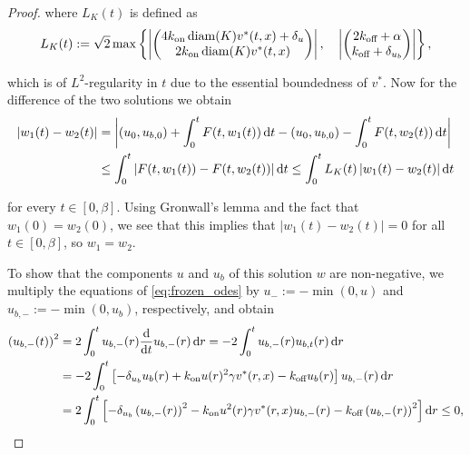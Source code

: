 \begin{proof}
    \noindent
    where $L_K(t)$ is defined as
%
    \begin{equation*}
        L_K(t) := \sqrt{2} \max \left\{ \left| \begin{pmatrix}
            4 k_\text{on} \operatorname*{diam}(K) v^*(t, x) + \delta_u \\
            2 k_\text{on} \operatorname*{diam}(K) v^*(t, x)
        \end{pmatrix} \right| ,\quad \left| \begin{pmatrix}
            2 k_\text{off} + \alpha \\
            k_\text{off} + \delta_{u_b}
        \end{pmatrix} \right| \right\} ,
    \end{equation*}

    \noindent
    which is of $L^2$-regularity in $t$ due to the essential boundedness of $v^*$. Now for the difference of the two solutions we obtain
%
    \begin{equation*}
        \begin{aligned}
            \left|w_1(t) - w_2(t)\right| &= \left|(u_0, u_{b,0}) + \int_{0}^{t} F(t, w_1(t)) \mathop{}\!\mathrm{d} t - (u_0, u_{b,0}) - \int_{0}^{t} F(t, w_2(t)) \mathop{}\!\mathrm{d} t \right| \\
            &\leq \int_{0}^{t} \left|F(t, w_1(t)) - F(t, w_2(t))\right| \mathop{}\!\mathrm{d} t \leq \int_{0}^{t} L_K(t) \left|w_1(t) - w_2(t)\right| \mathop{}\!\mathrm{d} t
        \end{aligned}
    \end{equation*}

    \noindent
    for every $t \in [0, \beta]$. Using Gronwall's lemma and the fact that $w_1(0) = w_2(0)$, we see that this implies that $\left|w_1(t) - w_2(t)\right| = 0$ for all $t \in [0, \beta]$, so $w_1 = w_2$.

    To show that the components $u$ and $u_b$ of this solution $w$ are non-negative, we multiply the equations of \cref{eq:frozen_odes} by $u_{-} := - \min (0, u)$ and $u_{b, -} := - \min (0, u_b)$, respectively, and obtain
%
    \begin{align*}
        \left( u_{b,-}(t) \right)^2 &= 2 \int_{0}^{t} u_{b,-}(r) \frac{\mathop{}\!\mathrm{d}}{\mathop{}\!\mathrm{d} t} u_{b, -}(r)\mathop{}\!\mathrm{d} r = - 2 \int_{0}^{t} u_{b,-}(r) u_{b, t}(r) \mathop{}\!\mathrm{d} r \\
        &= - 2 \int_{0}^{t} \left[ - \delta_{u_b} u_b(r) + k_\text{on} u(r)^2 \gamma v^*(r, x) - k_\text{off} u_b(r) \right] u_{b, -}(r) \mathop{}\!\mathrm{d} r \\
        &= 2 \int_{0}^{t} \left[ - \delta_{u_b} \left( u_{b,-}(r) \right)^2 - k_\text{on} u^2(r) \gamma v^*(r, x) u_{b,-}(r) - k_\text{off} \left( u_{b,-}(r) \right)^2 \right] \mathop{}\!\mathrm{d} r \leq 0,
    \end{align*}


\end{proof}
